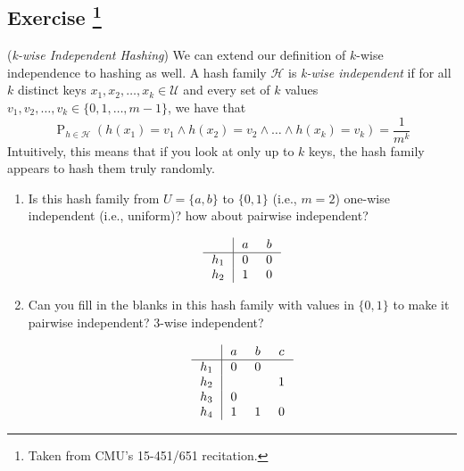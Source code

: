 \documentclass[14pt]{extreport}
\newcounter{counter}
\newcommand{\Exercise}{Exercise \stepcounter{counter}\thecounter}
\renewcommand{\Pr}[2][]{\operatorname{P}_{#1}\left(#2\right)}
\begin{document}
\subsection*{\Exercise\footnote{Taken from CMU's 15-451/651 recitation.}}
    (\textit{k-wise Independent Hashing}) We can extend our definition of $k$-wise independence to hashing as well. A hash family $\mathcal{H}$ is \textit{k-wise independent} if for all $k$ distinct keys $x_1, x_2, \ldots, x_k \in \mathcal{U}$ and every set of $k$ values $v_1, v_2, \ldots, v_k \in \{0, 1, \ldots, m-1\}$, we have that $$ \Pr[h \in \mathcal{H}]{h(x_1) = v_1 \land h(x_2) = v_2 \land \ldots \land h(x_k) = v_k} = \frac{1}{m^k} $$
    Intuitively, this means that if you look at only up to $k$ keys, the hash family appears to hash them truly randomly.
    \begin{enumerate}
        \item Is this hash family from $U = \{a, b\}$ to $\{0, 1\}$ (i.e., $m = 2$) one-wise independent (i.e., uniform)? how about pairwise independent?
        
        $$\arraycolsep=7pt
        \begin{array}{c|cc}
        & a & b \\
        \hline
        h_1 & 0 & 0 \\
        h_2 & 1 & 0 \\
        \end{array}
        $$
        
        \item Can you fill in the blanks in this hash family with values in $\{0, 1\}$ to make it pairwise independent? 3-wise independent?
        
        $$\arraycolsep=7pt
        \begin{array}{c|ccc}
        & a & b & c \\
        \hline
        h_1 & 0 & 0 &  \\
        h_2 &  &  & 1 \\
        h_3 & 0 &  &  \\
        h_4 & 1 & 1 & 0 \\
        \end{array}
        $$
    \end{enumerate}
\end{document}

